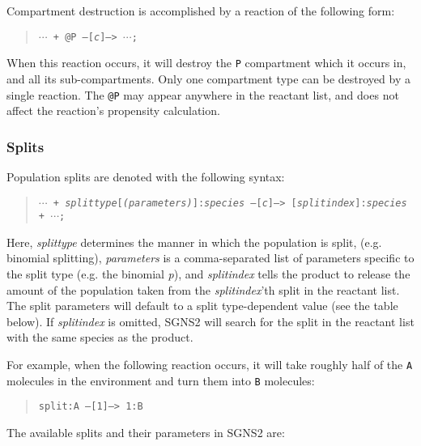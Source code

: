 \documentclass[10pt]{article}
\newcommand{\code}[1]{{\tt {#1}}}
\newcommand{\codeparam}[1]{\textrm{\textit{#1}}}
\newcommand{\optparam}[1]{\textrm{[\textit{#1}]}}
\newcommand{\programname}{SGNS2}
\begin{document}
Compartment destruction is accomplished by a reaction of the following form:

\begin{quote}
\code{$\cdots$ + @P --[\codeparam{c}]--> $\cdots$;}
\end{quote}

When this reaction occurs, it will destroy the \code{P} compartment which it occurs in, and all its sub-compartments. Only one compartment type can be destroyed by a single reaction. The \code{@P} may appear anywhere in the reactant list, and does not affect the reaction's propensity calculation.

\subsubsection{Splits}
\label{sec:splits}

Population splits are denoted with the following syntax:

\begin{quote}
\code{$\cdots$ + \codeparam{splittype}\optparam{\code{(}\codeparam{parameters}\code{)}}:\codeparam{species} --[\codeparam{c}]--> \optparam{splitindex}:\codeparam{species} + $\cdots$;}
\end{quote}

Here, \codeparam{splittype} determines the manner in which the population is split, (e.g. binomial splitting), \codeparam{parameters} is a comma-separated list of parameters specific to the split type (e.g. the binomial \codeparam{p}), and \codeparam{splitindex} tells the product to release the amount of the population taken from the \codeparam{splitindex}'th split in the reactant list. The split parameters will default to a split type-dependent value (see the table below). If \codeparam{splitindex} is omitted, {\programname} will search for the split in the reactant list with the same species as the product.

For example, when the following reaction occurs, it will take roughly half of the \code{A} molecules in the environment and turn them into \code{B} molecules:

\begin{quote}
\code{split:A --[1]--> 1:B}
\end{quote}

The available splits and their parameters in {\programname} are:
\end{document}
